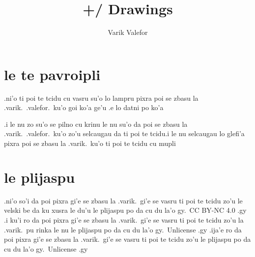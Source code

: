 \documentclass{report}
\title{+/ Drawings}
\author{Varik Valefor}
\begin{document}
\maketitle{}
\tableofcontents{}
\chapter{le te pavroipli}
.ni'o ti poi te tcidu cu vasru su'o lo lampru pixra poi se zbasu la .varik.\ .valefor.\ ku'o goi ko'a ge'u .e lo datni po ko'a

.i le nu zo su'o se pilno cu krinu le nu su'o da poi se zbasu la .varik.\ .valefor.\ ku'o zo'u selcaugau da ti poi te tcidu\@  .i le nu selcaugau lo glefi'a pixra poi se zbasu la .varik.\ ku'o ti poi te tcidu cu mupli

\chapter{le plijaspu}
.ni'o so'i da poi pixra gi'e se zbasu la .varik.\ gi'e se vasru ti poi te tcidu zo'u le velski be da ku xusra le du'u le plijaspu po da cu du la'o gy.\ CC BY-NC 4.0 .gy  .i ku'i ro da poi pixra gi'e se zbasu la .varik.\ gi'e se vasru ti poi te tcidu zo'u la .varik.\ pu rinka le nu le plijaspu po da cu du la'o gy.\ Unlicense .gy  .ija'e ro da poi pixra gi'e se zbasu la .varik.\ gi'e se vasru ti poi te tcidu zo'u le plijaspu po da cu du la'o gy.\ Unlicense .gy
\end{document}

